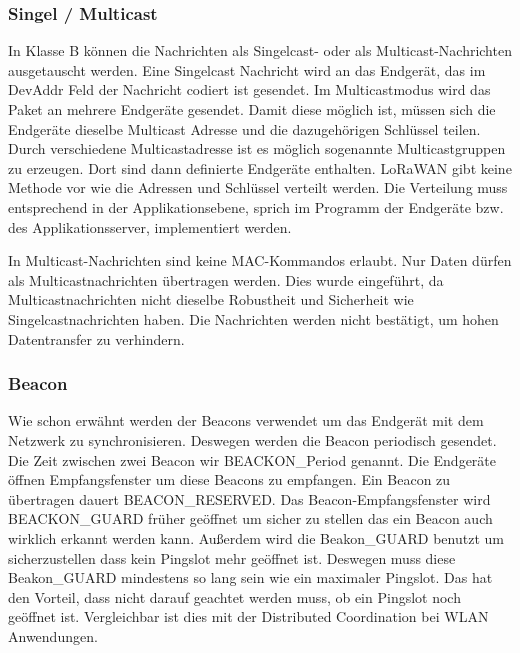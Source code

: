 \documentclass[a4paper, 12pt]{article}
\begin{document}
            \subsubsection{Singel / Multicast}
                In Klasse B können die Nachrichten als Singelcast- oder als Multicast-Nachrichten ausgetauscht werden. 
                Eine Singelcast Nachricht wird an das Endgerät, das im DevAddr Feld der Nachricht codiert ist gesendet.
                Im Multicastmodus wird das Paket an mehrere Endgeräte gesendet. Damit diese möglich ist, müssen sich 
                die Endgeräte dieselbe Multicast Adresse und die dazugehörigen Schlüssel teilen. Durch verschiedene 
                Multicastadresse ist es möglich sogenannte Multicastgruppen zu erzeugen. Dort sind dann definierte 
                Endgeräte enthalten. LoRaWAN gibt keine Methode vor wie die Adressen und 
                Schlüssel verteilt werden. Die Verteilung muss entsprechend in der Applikationsebene, sprich im Programm der 
                Endgeräte bzw. des Applikationsserver, implementiert werden. 

                In Multicast-Nachrichten sind keine MAC-Kommandos erlaubt. Nur Daten dürfen als Multicastnachrichten 
                übertragen werden. Dies wurde eingeführt, da Multicastnachrichten nicht dieselbe Robustheit und Sicherheit wie 
                Singelcastnachrichten haben. Die Nachrichten werden nicht bestätigt, um hohen Datentransfer zu verhindern.\cite[S.84]{LoRaSpec}

            \subsubsection{Beacon}
                Wie schon erwähnt werden der Beacons verwendet um das Endgerät mit dem Netzwerk zu synchronisieren. 
                Deswegen werden die Beacon periodisch gesendet. Die Zeit zwischen zwei Beacon wir BEACKON\_Period 
                genannt. Die Endgeräte öffnen Empfangsfenster um diese Beacons zu empfangen. Ein Beacon zu übertragen 
                dauert BEACON\_RESERVED. Das Beacon-Empfangsfenster wird BEACKON\_GUARD früher geöffnet um 
                sicher zu stellen das ein Beacon auch wirklich erkannt werden kann. Außerdem wird die Beakon\_GUARD 
                benutzt um sicherzustellen dass kein Pingslot mehr geöffnet ist. Deswegen muss diese Beakon\_GUARD 
                mindestens so lang sein wie ein maximaler Pingslot. Das hat den Vorteil, dass nicht darauf geachtet
                werden muss, ob ein Pingslot noch geöffnet ist. Vergleichbar ist dies mit der Distributed Coordination 
                bei WLAN Anwendungen.
\end{document}
